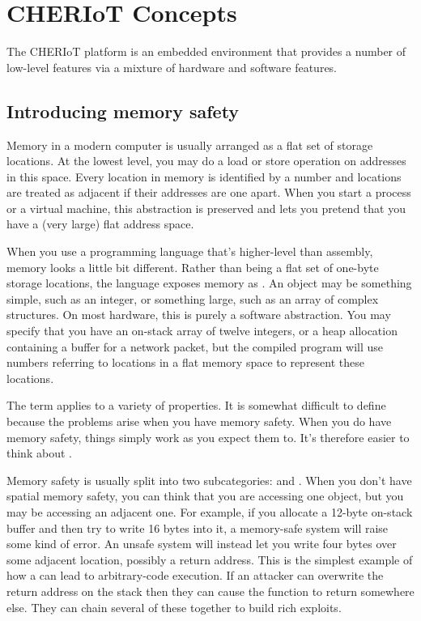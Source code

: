 \chapter[label=concepts]{CHERIoT Concepts}

The CHERIoT platform is an embedded environment that provides a number of low-level features via a mixture of hardware and software features.

\section{Introducing memory safety}

Memory in a modern computer is usually arranged as a flat set of storage locations.
At the lowest level, you may do a load or store operation on addresses in this space.
Every location in memory is identified by a number and locations are treated as adjacent if their addresses are one apart.
When you start a process or a virtual machine, this abstraction is preserved and  lets you pretend that you have a (very large) flat address space.

When you use a programming language that's higher-level than assembly, memory looks a little bit different.
Rather than being a flat set of one-byte storage locations, the language exposes memory as .
An object may be something simple, such as an integer, or something large, such as an array of complex structures.
On most hardware, this is purely a software abstraction.
You may specify that you have an on-stack array of twelve integers, or a heap allocation containing a buffer for a network packet, but the compiled program will use numbers referring to locations in a flat memory space to represent these locations.

The term  applies to a variety of properties.
It is somewhat difficult to define because the problems arise when you  have memory safety.
When you do have memory safety, things simply work as you expect them to.
It's therefore easier to think about .

Memory safety is usually split into two subcategories:  and .
When you don't have spatial memory safety, you can think that you are accessing one object, but you may be accessing an adjacent one.
For example, if you allocate a 12-byte on-stack buffer and then try to write 16 bytes into it, a memory-safe system will raise some kind of error.
An unsafe system will instead let you write four bytes over some adjacent location, possibly a return address.
This is the simplest example of how a  can lead to arbitrary-code execution.
If an attacker can overwrite the return address on the stack then they can cause the function to return somewhere else.
They can chain several of these together to build rich exploits.

